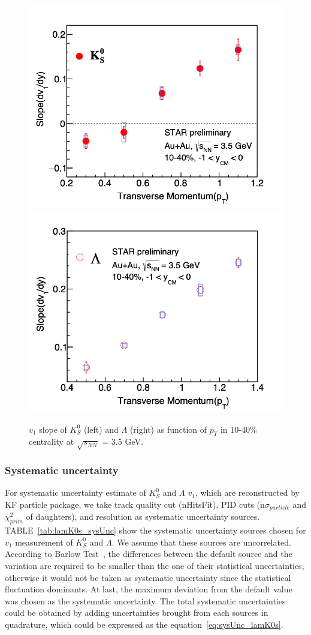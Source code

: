 \begin{figure}[hbt!]
\centering
\includegraphics[width=0.45\linewidth]{figures/chapter03/3p5gev_K0s_v1Slope_pT.png}
\includegraphics[width=0.45\linewidth]{figures/chapter03/3p5gev_Lambda_v1Slope_pT.png}
\caption{$v_1$ slope of $K^0_S$ (left) and $\Lambda$ (right) as function of $p_T$ in 10-40\% centrality at $\sqrt{s_{NN}}$ = 3.5 GeV.}
\label{fig:3p5gev_K0sLam_v1Slope_pt}
\end{figure}

\subsubsection{Systematic uncertainty}

For systematic uncertainty estimate of $K^0_S$ and $\Lambda$ $v_1$, which are reconstructed by KF particle package, 
we take track quality cut (nHitsFit), PID cuts (n$\sigma_{particle}$ and $\chi^2_{prim}$ of daughters), and resolution as systematic uncertainty sources.
TABLE~\ref{tab:lamK0s_sysUnc} show the systematic uncertainty sources chosen for $v_1$ measurement of $K^0_S$ and $\Lambda$.
We assume that these sources are uncorrelated. According to Barlow Test~\cite{barlow2002systematic}, the differences between the default source and the variation are required
to be smaller than the one of their statistical uncertainties, otherwise it would not be taken as systematic uncertainty since the statistical fluctuation dominants.
At last, the maximum deviation from the default value was chosen as the systematic uncertainty. 
The total systematic uncertainties could be obtained by adding uncertainties brought from each sources in quadrature, 
which could be expressed as the equation~\ref{eq:sysUnc_lamK0s}.

